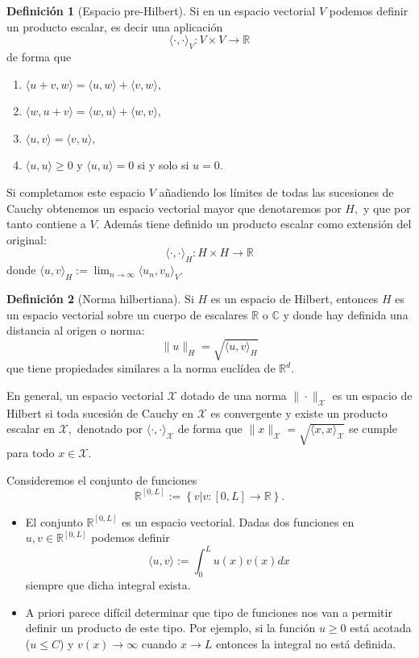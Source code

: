 \documentclass[10pt,handout]{beamer}
\theoremstyle{plain} %
\theoremstyle{plain} %
\theoremstyle{plain} %
\theoremstyle{plain} %
\theoremstyle{definition}
\newtheorem{defn}{Definici\'on}
\theoremstyle{example}
\theoremstyle{example}
\theoremstyle{remark}
\theoremstyle{remark}
\begin{document}
\begin{frame}
\begin{defn}[Espacio pre-Hilbert]
Si en un espacio vectorial $V$ podemos definir un producto escalar, es decir una aplicación
$$
\langle \cdot, \cdot \rangle_V : V \times V \longrightarrow \mathbb{R}
$$ 
de forma que 
\begin{enumerate}
\item $\langle u+v, w \rangle = \langle u, w \rangle +  \langle v, w \rangle,$
\item $\langle w, u+v \rangle = \langle w, u \rangle +  \langle w, v \rangle,$
\item $\langle u, v \rangle = \langle v, u \rangle,$
\item $\langle u,u \rangle \ge 0$ y $\langle u,u \rangle = 0$ si y solo si $u=0.$
\end{enumerate}
Si completamos este espacio $V$ añadiendo los límites de todas las sucesiones de Cauchy 
obtenemos un espacio vectorial mayor que denotaremos por $H,$ y que por tanto
contiene a $V.$ Además tiene definido un producto escalar como extensión del original:
$$
\langle \cdot, \cdot \rangle_H : H \times H \longrightarrow  \mathbb{R}
$$ 
donde $\langle u, v\rangle_H := \lim_{n \rightarrow \infty} \langle u_n, v_n\rangle_V.$
\end{defn}
\end{frame}

\begin{frame}
\begin{defn}[Norma hilbertiana]
Si $H$ es un espacio de Hilbert, entonces $H$ es un espacio vectorial sobre un cuerpo de escalares $\mathbb{R}$ o $\mathbb{C}$ y donde hay definida una distancia al origen o norma:
$$
\|u\|_H = \sqrt{\langle u, v\rangle_H}
$$
que tiene propiedades similares a la norma euclídea de $\mathbb{R}^d.$
\end{defn}
En general, un espacio vectorial $\mathcal{X}$ dotado de una norma $\|\cdot\|_{\mathcal{X}}$ es un espacio de Hilbert si toda sucesión de Cauchy en $\mathcal{X}$ es convergente y existe un producto escalar en $\mathcal{X},$ denotado por $\langle \cdot,\cdot \rangle_{\mathcal{X}}$ de forma que $\|x\|_{\mathcal{X}}= \sqrt{\langle x,x \rangle_{\mathcal{X}}}$ se cumple para todo $x \in \mathcal{X}.$ 
\end{frame}

\begin{frame}
Consideremos el conjunto de funciones $$\mathbb{R}^{[0,L]}:=\left\{v|v:[0,L] \longrightarrow \mathbb{R}\right\}.$$
\begin{itemize}
\item El conjunto $\mathbb{R}^{[0,L]}$ es un espacio vectorial. Dadas dos funciones en $u,v \in \mathbb{R}^{[0,L]}$ podemos definir
$$
\langle u,v \rangle := \int_0^L u(x)v(x) dx
$$
siempre que dicha integral exista.
\item A priori parece difícil determinar que tipo de funciones nos van a permitir definir un producto
de este tipo. Por ejemplo,  si la función $u \ge 0$ está acotada ($u \le C$) y $v(x) \rightarrow \infty$ cuando $x \rightarrow L$ 
entonces la integral no está definida.
\end{itemize}
\end{frame}
\end{document}
